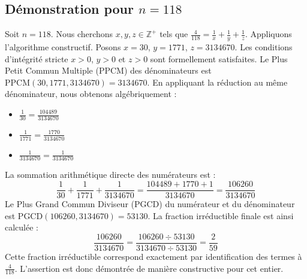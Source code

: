 \documentclass[11pt,a4paper]{article}
\begin{document}
\subsection{Démonstration pour $n = 118$}
Soit $n = 118$. Nous cherchons $x, y, z \in \mathbb{Z}^{+}$ tels que $\frac{4}{118} = \frac{1}{x} + \frac{1}{y} + \frac{1}{z}$.
Appliquons l'algorithme constructif. Posons $x = 30$, $y = 1771$, $z = 3134670$.
Les conditions d'intégrité stricte $x > 0$, $y > 0$ et $z > 0$ sont formellement satisfaites.
Le Plus Petit Commun Multiple (PPCM) des dénominateurs est $\text{PPCM}(30, 1771, 3134670) = 3134670$.
En appliquant la réduction au même dénominateur, nous obtenons algébriquement :
\begin{itemize}
    \item $\frac{1}{30} = \frac{104489}{3134670}$
    \item $\frac{1}{1771} = \frac{1770}{3134670}$
    \item $\frac{1}{3134670} = \frac{1}{3134670}$
\end{itemize}
La sommation arithmétique directe des numérateurs est :
$$ \frac{1}{30} + \frac{1}{1771} + \frac{1}{3134670} = \frac{104489 + 1770 + 1}{3134670} = \frac{106260}{3134670} $$
Le Plus Grand Commun Diviseur (PGCD) du numérateur et du dénominateur est $\text{PGCD}(106260, 3134670) = 53130$.
La fraction irréductible finale est ainsi calculée :
$$ \frac{106260}{3134670} = \frac{106260 \div 53130}{3134670 \div 53130} = \frac{2}{59} $$
Cette fraction irréductible correspond exactement par identification des termes à $\frac{4}{118}$. L'assertion est donc démontrée de manière constructive pour cet entier.
\end{document}
